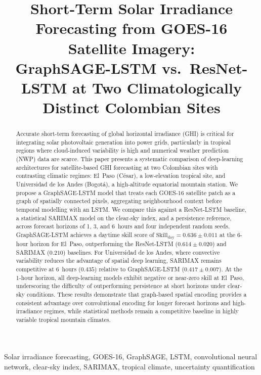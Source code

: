 \documentclass[lettersize,journal]{IEEEtran}
\title{Short-Term Solar Irradiance Forecasting from GOES-16 Satellite Imagery:\\
       GraphSAGE-LSTM vs.\ ResNet-LSTM at Two Climatologically Distinct Colombian Sites}
\author{
    \IEEEauthorblockN{
        Esteban Ladino Nieto
    }
    \IEEEauthorblockA{
        Department of Mechanical and Industrial Engineering\\
        Universidad de los Andes, Bogotá, Colombia\\
        e.ladino@uniandes.edu.co
    }
}
\newcommand{\skillday}{\text{Skill}_\text{day}}
\begin{document}
\maketitle

\begin{abstract}
Accurate short-term forecasting of global horizontal irradiance (GHI) is critical
for integrating solar photovoltaic generation into power grids, particularly in
tropical regions where cloud-induced variability is high and numerical weather
prediction (NWP) data are scarce. This paper presents a systematic comparison of
deep-learning architectures for satellite-based GHI forecasting at two Colombian
sites with contrasting climatic regimes: El~Paso (C{\'e}sar), a low-elevation
tropical site, and Universidad de los Andes (Bogot{\'a}), a high-altitude equatorial
mountain station. We propose a GraphSAGE-LSTM model that treats each GOES-16
satellite patch as a graph of spatially connected pixels, aggregating neighbourhood
context before temporal modelling with an LSTM. We compare this against a
ResNet-LSTM baseline, a statistical SARIMAX model on the clear-sky index, and a
persistence reference, across forecast horizons of 1, 3, and 6~hours and four
independent random seeds. GraphSAGE-LSTM achieves a daytime skill score of
$\skillday = 0.636 \pm 0.011$ at the 6-hour horizon for El~Paso, outperforming
the ResNet-LSTM ($0.614 \pm 0.020$) and SARIMAX ($0.210$) baselines. For
Universidad de los Andes, where convective variability reduces the advantage of
spatial deep learning, SARIMAX remains competitive at 6~hours ($0.435$) relative
to GraphSAGE-LSTM ($0.417 \pm 0.007$). At the 1-hour horizon, all deep-learning
models exhibit negative or near-zero skill at El~Paso, underscoring the difficulty
of outperforming persistence at short horizons under clear-sky conditions. These
results demonstrate that graph-based spatial encoding provides a consistent
advantage over convolutional encoding for longer forecast horizons and high-irradiance
regimes, while statistical methods remain a competitive baseline in highly variable
tropical mountain climates.
\end{abstract}

\begin{IEEEkeywords}
Solar irradiance forecasting, GOES-16, GraphSAGE, LSTM, convolutional neural network,
clear-sky index, SARIMAX, tropical climate, uncertainty quantification
\end{IEEEkeywords}
\end{document}
